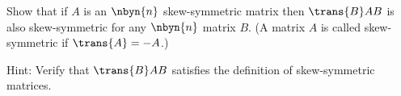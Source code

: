
\begin{Exercise}[
name={},
title={}, 
difficulty=0,
origin={\cite{BS}}]
Show that if $A$ is an $\nbyn{n}$ skew-symmetric matrix then $\trans{B}AB$ is also skew-symmetric
for any $\nbyn{n}$ matrix $B$. (A matrix $A$ is called skew-symmetric if $\trans{A} = -A$.)
\end{Exercise}

\begin{Answer}
Hint: Verify that $\trans{B}AB$ satisfies the definition of skew-symmetric matrices.
\end{Answer}

